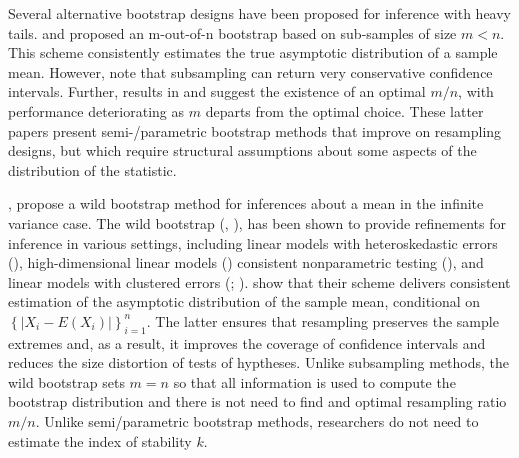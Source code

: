 \documentclass[english, 11pt,a4paper, ]{article}
\begin{document}
Several alternative bootstrap designs have been proposed for inference with heavy tails. \cite{politisRomano1994AoS} and \cite{romanoWolf1999metrika} proposed an m-out-of-n bootstrap based on sub-samples of size $m<n $. This scheme consistently estimates the true asymptotic distribution of a sample mean. However, \cite{hallYao2003econometrica} note that subsampling can return very conservative confidence intervals. Further, results in \cite{davidsonFlachaire2007joe} and \cite{corneaDavidson2015et} suggest the existence of an optimal  $m/n$, with performance deteriorating as $m$ departs from the optimal choice. These latter papers present semi-/parametric bootstrap methods that improve on resampling designs, but which require structural assumptions about some aspects of the distribution of the statistic. 

 \cite{cavaliere2013econometricreviews}, propose a wild bootstrap method for inferences about a mean in the infinite variance case.  The wild bootstrap (\citealp{Wu1986AoS}, \citealp{liu1988AoS}), has been  shown to provide refinements for inference in various settings, including linear models with heteroskedastic errors (\citealp{davidsonFlachaire2008joe}), high-dimensional linear models (\citealp{mammen1993AoS}) consistent nonparametric testing (\citealp{hardleMammen1993AoS}), and linear models with clustered errors (\citealp{cameronGelbachMiller2008REStats}; \citealp{djogbenouMacKinnonMorten2019joe}). \cite{cavaliere2013econometricreviews} show that their scheme delivers consistent estimation of the asymptotic distribution of the sample mean, conditional on $\left\{ |X_i-E(X_i)|\right\}_{i=1}^n$. The latter ensures that resampling preserves the sample extremes and, as a result, it improves the coverage of confidence intervals and reduces the size distortion of tests of hyptheses. Unlike subsampling methods, the wild bootstrap sets $m=n$ so that all information is used to compute the bootstrap distribution and there is not need to find and optimal resampling ratio $m/n$. Unlike semi/parametric bootstrap methods, researchers do not need to estimate the index of stability $k$. 
\end{document}
